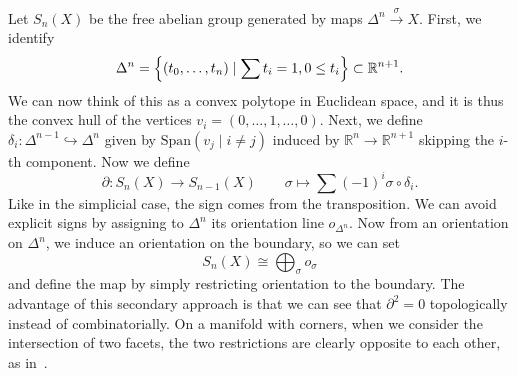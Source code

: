 \documentclass[leqno, openany]{memoir}
\theoremstyle{definition}
\theoremstyle{remark}
\theoremstyle{plain}
\theoremstyle{definition}
\theoremstyle{remark}
\newcommand{\R}{\mathbb{R}}
\newcommand{\mr}[1]{\mathrm{#1}}
\begin{document}
Let $S_n(X)$ be the free abelian group generated by maps $\Delta^n \xrightarrow{\sigma} X$. First, we identify 
\[ \Delta^n = \qty{(t_0, \ldots, t_n) \mid \sum t_i = 1, 0 \leq t_i } \subset \R^{n+1}. \]
We can now think of this as a convex polytope in Euclidean space, and it is thus the convex hull of the vertices $v_i = (0, \ldots, 1, \ldots, 0)$. Next, we define $\delta_i \colon \Delta^{n-1} \hookrightarrow \Delta^n$ given by $\mr{Span}(v_j \mid i \neq j)$ induced by $\R^{n} \to \R^{n+1}$ skipping the $i$-th component. Now we define
\[ \partial \colon S_n(X) \to S_{n-1}(X) \qquad \sigma \mapsto \sum (-1)^i \sigma \circ \delta_i. \]
Like in the simplicial case, the sign comes from the transposition. We can avoid explicit signs by assigning to $\Delta^n$ its orientation line $o_{\Delta^n}$. Now from an orientation on $\Delta^n$, we induce an orientation on the boundary, so we can set
\[ S_n(X) \cong \bigoplus_{\sigma} o_{\sigma} \]
and define the map by simply restricting orientation to the boundary. The advantage of this secondary approach is that we can see that $\partial^2 = 0$ topologically instead of combinatorially. On a manifold with corners, when we consider the intersection of two facets, the two restrictions are clearly opposite to each other, as in~.
\end{document}

